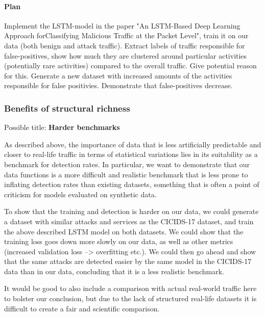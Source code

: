 \documentclass[sigconf]{acmart}
\begin{document}
\paragraph{Plan}
Implement the LSTM-model in the paper "An LSTM-Based Deep Learning Approach forClassifying Malicious Traffic at the Packet Level", train it on our data (both benign and attack traffic). Extract labels of traffic responsible for false-positives, show how much they are clustered around particular activities (potentially rare activities) compared to the overall traffic. Give potential reason for this. Generate a new dataset with increased amounts of the activities responsible for false positivies. Demonstrate that false-positives decrease.

\subsubsection{Benefits of structural richness}

Possible title: \textbf{Harder benchmarks}

As described above, the importance of data that is less artificially predictable and closer to real-life traffic in terms of statistical variations lies in its suitability as a benchmark for detection rates. In particular, we want to demonstrate that our data functions is a more difficult and realistic benchmark that is less prone to inflating detection rates than existing datasets, something that is often a point of criticism for models evaluated on synthetic data. 

To show that the training and detection is harder on our data, we could generate a dataset with similar attacks and services as the CICIDS-17 dataset, and train the above described LSTM model on both datasets. We could show that the training loss goes down more slowly on our data, as well as other metrics (increased validation loss --> overfitting etc.). We could then go ahead and show that the same attacks are detected easier by the same model in the CICIDS-17 data than in our data, concluding that it is a less realistic benchmark.

It would be good to also include a comparison with actual real-world traffic here to bolster our conclusion, but due to the lack of structured real-life datasets it is difficult to create a fair and scientific comparison. 

\end{document}
